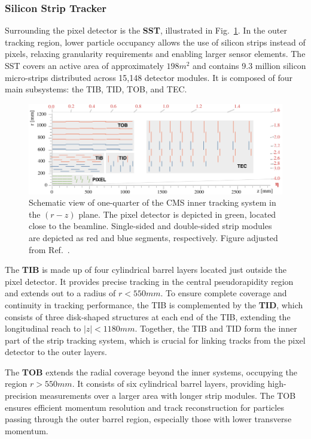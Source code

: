 \subsubsection{Silicon Strip Tracker}
Surrounding the pixel detector is the \textbf{\ac{SST}}, illustrated in Fig.~\ref{Figure:Chapter3_Tracker_Geometry}. In the outer tracking region, lower particle occupancy allows the use of silicon strips instead of pixels, relaxing granularity requirements and enabling larger sensor elements. The SST covers an active area of approximately $198\unit{m}^2$ and contains 9.3 million silicon micro-strips distributed across 15,148 detector modules. It is composed of four main subsystems: the \ac{TIB}, \ac{TID}, \ac{TOB}, and \ac{TEC}.

\begin{figure}[h]
\centering
\includegraphics[width=1\textwidth]{Figures/Chapter3/Phase1_Tracker.pdf}
\caption[Schematic of CMS inner tracking system in the $(r-z)$ plane]{Schematic view of one-quarter of the CMS inner tracking system in the $(r-z)$ plane. The pixel detector is depicted in green, located close to the beamline. Single-sided and double-sided strip modules are depicted as red and blue segments, respectively. Figure adjusted from Ref.~\cite{CMS_Detector_Run3}.}
\label{Figure:Chapter3_Tracker_Geometry}
\end{figure}

The \textbf{TIB} is made up of four cylindrical barrel layers located just outside the pixel detector. It provides precise tracking in the central pseudorapidity region and extends out to a radius of $r < 550\unit{mm}$. To ensure complete coverage and continuity in tracking performance, the TIB is complemented by the \textbf{TID}, which consists of three disk-shaped structures at each end of the TIB, extending the longitudinal reach to $|z| < 1180\unit{mm}$. Together, the TIB and TID form the inner part of the strip tracking system, which is crucial for linking tracks from the pixel detector to the outer layers.

The \textbf{TOB} extends the radial coverage beyond the inner systems, occupying the region $r > 550\unit{mm}$. It consists of six cylindrical barrel layers, providing high-precision measurements over a larger area with longer strip modules. The TOB ensures efficient momentum resolution and track reconstruction for particles passing through the outer barrel region, especially those with lower transverse momentum.

